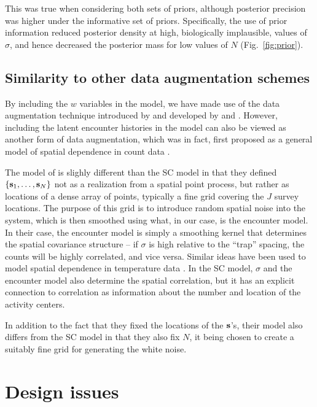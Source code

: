 This was true when considering
both sets of priors, although posterior precision was higher under the
informative set of priors. Specifically, the use of prior information
reduced posterior density at high, biologically implausible,
values of $\sigma$, and hence decreased the posterior mass for
low values of $N$ (Fig.~\ref{fig:prior}).


\subsection{Similarity to other data augmentation schemes}

By including the $w$ variables in the model, we have made use of the
data augmentation technique introduced by \citet{royle_etal:2007} and
developed by \citep{royle:2009} and
\citep{royle_dorazio:2010}. However, including the latent encounter
histories in the model can also be viewed as another form of data
augmentation, which was in fact, first proposed as a general model of
spatial dependence in count data
\citep{wolpert_ickstadt:1998}.

The model of
\citet{wolpert_ickstadt:1998} is slighly different than the SC model
in that they defined $\{{\bf s}_1, \ldots, {\bf s}_N\}$ not as a
realization from a spatial point process, but rather as locations of a
dense array of points, typically a fine grid covering the $J$ survey
locations. The purpose of this grid is to introduce random spatial noise into the system,
which is then smoothed using what, in our case, is the encounter
model. In their case, the encounter model is simply a smoothing
kernel that determines the spatial covariance structure -- if $\sigma$
is high relative to the ``trap'' spacing, the counts will be highly
correlated, and vice versa. Similar ideas have been used to model
spatial dependence in temperature data \citep{higdon:1998}. In the SC
model, $\sigma$ and the encounter model also determine the spatial
correlation, but it has an explicit connection to
correlation as information about the number and location of the
activity centers.

In addition to the fact that they fixed
the locations of the $\bf s$'s, their model also differs from the SC
model in that they also fix $N$, it being chosen to create a suitably
fine grid for generating the white noise.



\section{Design issues}

